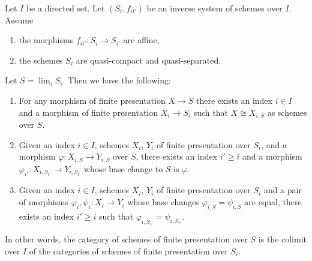 \begin{lemma}
\label{lemma-descend-finite-presentation}
Let $I$ be a directed set.
Let $(S_i, f_{ii'})$ be an inverse system of schemes over $I$.
Assume
\begin{enumerate}
\item the morphisms $f_{ii'} : S_i \to S_{i'}$ are affine,
\item the schemes $S_i$ are quasi-compact and quasi-separated.
\end{enumerate}
Let $S = \lim_i S_i$. Then we have the following:
\begin{enumerate}
\item For any morphism of finite presentation $X \to S$
there exists an index $i \in I$ and a morphism of finite
presentation $X_i \to S_i$ such that $X \cong X_{i, S}$ as
schemes over $S$.
\item Given an index $i \in I$, schemes
$X_i$, $Y_i$ of finite presentation over $S_i$, and a morphism
$\varphi : X_{i, S} \to Y_{i, S}$ over $S$, there exists an index
$i' \geq i$ and a morphism
$\varphi_{i'} : X_{i, S_{i'}} \to Y_{i, S_{i'}}$
whose base change to $S$ is $\varphi$.
\item Given an index $i \in I$, schemes $X_i$, $Y_i$ of finite presentation
over $S_i$ and a pair of morphisms $\varphi_i, \psi_i : X_i \to Y_i$
whose base changes $\varphi_{i, S} = \psi_{i, S}$ are equal,
there exists an index $i' \geq i$ such that
$\varphi_{i, S_{i'}} = \psi_{i, S_{i'}}$.
\end{enumerate}
In other words, the category of schemes of finite presentation over
$S$ is the colimit over $I$ of the categories of schemes of finite
presentation over $S_i$.
\end{lemma}

